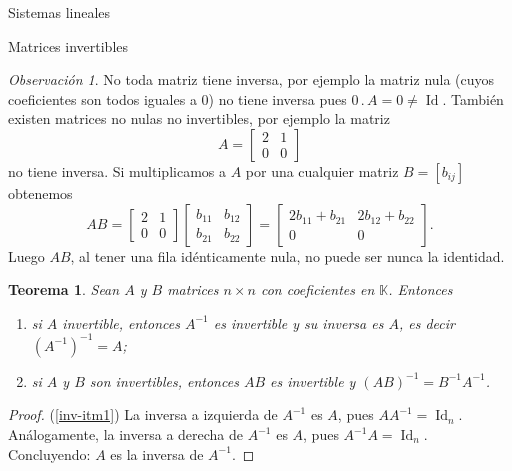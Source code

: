 \documentclass[a4paper,12pt,twoside,spanish,reqno]{amsbook}
\newtheorem{teorema}{Teorema}[section]
\theoremstyle{definition}
\theoremstyle{remark}
\newtheorem{observacion}{Observaci\'on}[section]
\newcommand{\Id}{\operatorname{Id}}
\newcommand{\K}{\mathbb K}
\begin{document}
\begin{chapter}{Sistemas lineales}
\begin{section}{Matrices invertibles}
            \begin{observacion}
                No toda matriz tiene inversa, por ejemplo  la  matriz nula (cuyos coeficientes son todos iguales a $0$) no tiene inversa pues $0\,.\, A= 0 \not= \Id$.  También existen matrices no nulas no invertibles,  por ejemplo la matriz 
                \begin{equation*}
                A = \begin{bmatrix} 2&1\\ 0&0\end{bmatrix}
                \end{equation*}
                no tiene inversa.
                Si  multiplicamos a $A$ por una cualquier matriz  $B =[b_{ij}]$ obtenemos
                \begin{equation*}
                AB = \begin{bmatrix} 2&1\\ 0&0\end{bmatrix}
                \begin{bmatrix} b_{11}&b_{12}\\ b_{21}&b_{22}\end{bmatrix} =
                \begin{bmatrix} 2b_{11}+b_{21}&2b_{12}+b_{22}\\0 &0\end{bmatrix}.
                \end{equation*}
                Luego $AB$, al tener una fila idénticamente nula, no puede ser nunca la identidad. 
            \end{observacion}
            
            
            
            \begin{teorema}\label{th-prod-inv-impl-inv}
                Sean $A$ y $B$ matrices $n \times n$ con coeficientes en $\K$. Entonces
                \begin{enumerate}
                    \item \label{inv-itm1} si $A$ invertible,  entonces $A^{-1}$  es invertible y su inversa es $A$,  es decir $(A^{-1})^{-1}=A$;
                    \item \label{inv-itm2} si $A$ y $B$ son invertibles, entonces $AB$ es invertible y $(AB)^{-1} = B^{-1}A^{-1}$.
                \end{enumerate}
            \end{teorema}
                \begin{proof}
                    (\ref{inv-itm1}) La inversa a izquierda de $A^{-1}$ es $A$, pues $AA^{-1}=\Id_n$. Análogamente, la inversa a derecha de $A^{-1}$ es $A$, pues $A^{-1}A = \Id_n$. Concluyendo: $A$  es la inversa de $A^{-1}$.
                    

\end{proof}
\end{section}
\end{chapter}
\end{document}
